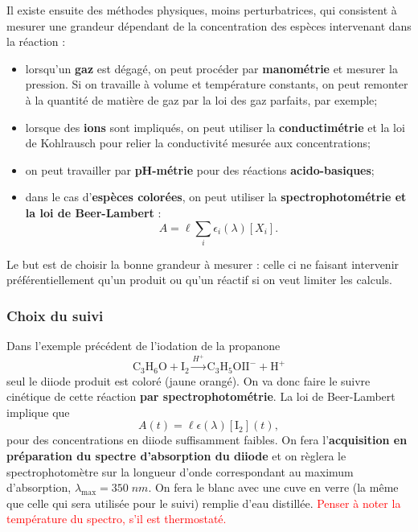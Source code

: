 \documentclass[11pt,a4paper]{report}
\begin{document}
Il existe ensuite des méthodes physiques, moins perturbatrices, qui consistent à mesurer une grandeur dépendant de la concentration des espèces intervenant dans la réaction :
\begin{itemize}
	\item lorsqu'un \textbf{gaz} est dégagé, on peut procéder par \textbf{manométrie} et mesurer la 	pression. Si on travaille à volume et température constants, on peut remonter à la quantité de 		matière de gaz par la loi des gaz parfaits, par exemple;
	\item lorsque des \textbf{ions} sont impliqués, on peut utiliser la \textbf{conductimétrie} et 		la loi de Kohlrausch pour relier la conductivité mesurée aux concentrations;
	\item on peut travailler par \textbf{pH-métrie} pour des réactions \textbf{acido-basiques};
	\item dans le cas d'\textbf{espèces colorées}, on peut utiliser la \textbf{spectrophotométrie 		et la loi de Beer-Lambert} :
	\begin{equation}
		\boxed{A = \ell \sum_i \epsilon_i(\lambda)[X_i]}.
	\end{equation}
\end{itemize}

Le but est de choisir la bonne grandeur à mesurer : celle ci ne faisant intervenir préférentiellement qu'un produit ou qu'un réactif si on veut limiter les calculs.

\subsubsection{Choix du suivi}

Dans l'exemple précédent de l'iodation de la propanone
\begin{equation}
	\text{C}_3\text{H}_6\text{O} + \text{I}_2 \xrightarrow{H^+} 
	\text{C}_3\text{H}_5\text{O}\text{I} \text{I}^- + \text{H}^+
\end{equation}
 seul le diiode produit est coloré (jaune orangé). On va donc faire le suivre cinétique de cette réaction \textbf{par spectrophotométrie}. La loi de Beer-Lambert implique que
\begin{equation}
	A(t) = \ell \epsilon(\lambda) [\text{I}_2](t),
\end{equation}
pour des concentrations en diiode suffisamment faibles. On fera l'\textbf{acquisition en préparation du spectre d'absorption du diiode} et on règlera le spectrophotomètre sur la longueur d'onde correspondant au maximum d'absorption, $\lambda_\text{max} = 350\;nm$. On fera le blanc avec une cuve en verre (la même que celle qui sera utilisée pour le suivi) remplie d'eau distillée. \textcolor{red}{Penser à noter la température du spectro, s'il est thermostaté.}\\
 
\end{document}
